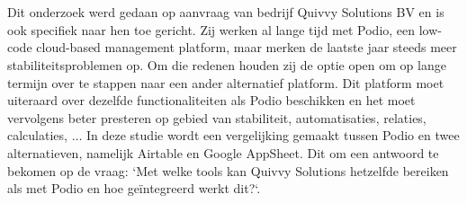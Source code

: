 
%
%
%
%

%



%

\chapter*{}

Dit onderzoek werd gedaan op aanvraag van bedrijf Quivvy Solutions BV en is ook specifiek naar hen toe gericht. Zij werken al lange tijd met Podio, een low-code cloud-based management platform, maar merken de laatste jaar steeds meer stabiliteitsproblemen op. Om die redenen houden zij de optie open om op lange termijn over te stappen naar een ander alternatief platform. Dit platform moet uiteraard over dezelfde functionaliteiten als Podio beschikken en het moet vervolgens beter presteren op gebied van stabiliteit, automatisaties, relaties, calculaties, $\ldots$ In deze studie wordt een vergelijking gemaakt tussen Podio en twee alternatieven, namelijk Airtable en Google AppSheet. Dit om een antwoord te bekomen op de vraag: `Met welke tools kan Quivvy Solutions hetzelfde bereiken als met Podio en hoe geïntegreerd werkt dit?`. \\

